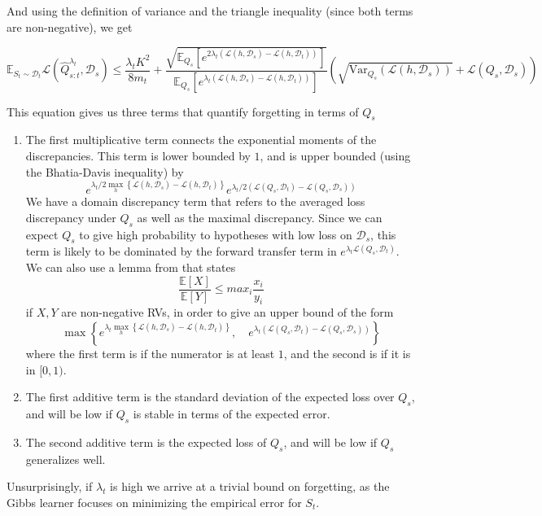 \documentclass[letterpaper]{article}
\theoremstyle{definition}
\begin{document}
And using the definition of variance and the triangle inequality (since both terms are non-negative), we get

\begin{equation} \label{eq:oracle-final}
\mathbb{E}_{S_t\sim \mathcal{D}_t}\mathcal{L}( \hat{Q}^{\lambda_t}_{s:t},\mathcal{D}_s)\leq \frac{\lambda_t K^2}{8m_t}+\frac{\sqrt{\mathbb{E}_{Q_s}\left [e^{2\lambda_t(\mathcal{L}(h,\mathcal{D}_s)-\mathcal{L}(h,\mathcal{D}_t))}\right ]}}{\mathbb{E}_{Q_s}\left [e^{\lambda_t(\mathcal{L}(h,\mathcal{D}_s)-\mathcal{L}(h,\mathcal{D}_t))}\right ]}(\sqrt{\mathrm{Var}_{Q_s}(\mathcal{L}(h,\mathcal{D}_s))}+\mathcal{L}(Q_s,\mathcal{D}_s))
\end{equation}

This equation gives us three terms that quantify forgetting in terms of $Q_s$
\begin{enumerate}
	\item The first multiplicative term connects the exponential moments of the discrepancies. This term is lower bounded by $1$, and is upper bounded (using the Bhatia-Davis inequality) by $$ e^{\lambda_t/2\max_h\left \{\mathcal{L}(h,\mathcal{D}_s)-\mathcal{L}(h,\mathcal{D}_t)\right \}}e^{\lambda_t/2(\mathcal{L}(Q_s,\mathcal{D}_t)-\mathcal{L}(Q_s,\mathcal{D}_s))}$$ 
	We have a domain discrepancy term that refers to the averaged loss discrepancy under $Q_s$ as well as the maximal discrepancy. Since we can expect $Q_s$ to give high probability to hypotheses with low loss on $\mathcal{D}_s$, this term is likely to be dominated by the forward transfer term in $e^{\lambda_t\mathcal{L}(Q_s,\mathcal{D}_t)}$.
	We can also use a lemma from \citet{cover1996universal} that states $$\frac{\mathbb{E}[X]}{\mathbb{E}[Y]}\leq max_i \frac{x_i}{y_i}$$ if $X,Y$ are non-negative RVs, in order to give an upper bound of the form $$\max\left \{e^{\lambda_t\max_h\left \{\mathcal{L}(h,\mathcal{D}_s)-\mathcal{L}(h,\mathcal{D}_t)\right \}},\quad  e^{\lambda_t(\mathcal{L}(Q_s,\mathcal{D}_t)-\mathcal{L}(Q_s,\mathcal{D}_s))}\right \}$$ where the first term is if the numerator is at least $1$, and the second is if it is in $[0,1)$.
	\item The first additive term is the standard deviation of the expected loss over $Q_s$, and will be low if $Q_s$ is stable in terms of the expected error.
	\item The second additive term is the expected loss of $Q_s$, and will be low if $Q_s$ generalizes well.
\end{enumerate}

Unsurprisingly, if $\lambda_t$ is high we arrive at a trivial bound on forgetting, as the Gibbs learner focuses on minimizing the empirical error for $S_t$.
\end{document}
